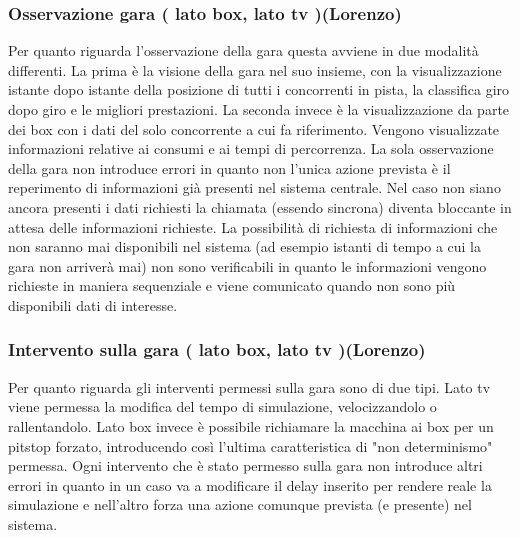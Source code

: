 \subsubsection{Osservazione gara ( lato box, lato tv )(Lorenzo)}
Per quanto riguarda l'osservazione della gara questa avviene in due modalità
differenti. La prima è la visione della gara nel suo insieme, con la
visualizzazione istante dopo istante della posizione di tutti i concorrenti in
pista, la classifica giro dopo giro e le migliori prestazioni. La seconda invece
è la visualizzazione da parte dei box con i dati del solo concorrente a cui fa
riferimento. Vengono visualizzate informazioni relative ai consumi e ai tempi di
percorrenza. La sola osservazione della gara non introduce errori in quanto non
l'unica azione prevista è il reperimento di informazioni già presenti nel
sistema centrale. Nel caso non siano ancora presenti i dati richiesti la
chiamata (essendo sincrona) diventa bloccante in attesa delle informazioni
richieste. La possibilità di richiesta di informazioni che non saranno mai
disponibili nel sistema (ad esempio istanti di tempo a cui la gara non arriverà
mai) non sono verificabili in quanto le informazioni vengono richieste in
maniera sequenziale e viene comunicato quando non sono più disponibili dati di
interesse.
\subsubsection{Intervento sulla gara ( lato box, lato tv )(Lorenzo)}
Per quanto riguarda gli interventi permessi sulla gara sono di due tipi. Lato tv
viene permessa la modifica del tempo di simulazione, velocizzandolo o
rallentandolo. Lato box invece è possibile richiamare la macchina ai box per un
pitstop forzato, introducendo così l'ultima caratteristica di "non determinismo"
permessa.
Ogni intervento che è stato permesso sulla gara non introduce altri errori in
quanto in un caso va a modificare il delay inserito per rendere reale la
simulazione e nell'altro forza una azione comunque prevista (e presente) nel
sistema. 
